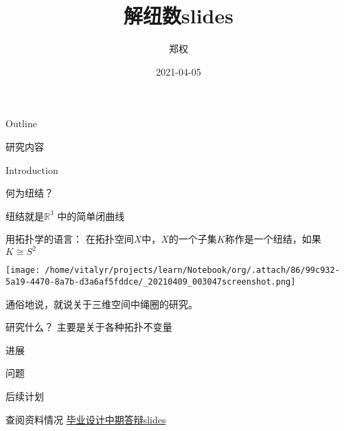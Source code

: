 \documentclass[bigger]{beamer}
\author{郑权}
\date{2021-04-05}
\title{解纽数slides}
\begin{document}
\maketitle
\begin{frame}{Outline}
\tableofcontents
\end{frame}


\begin{frame}[label={sec:org194fc46}]{研究内容}
\begin{block}{Introduction}
\begin{block}{何为纽结？}
\begin{block}{纽结就是\(\mathbb{R}^{3}\) 中的简单闭曲线}
\end{block}
\begin{block}{用拓扑学的语言：}
在拓扑空间\(X\)中，\(X\)的一个子集\(K\)称作是一个纽结，如果\(K \cong S^{2}\)

\begin{center}
\texttt{[image: /home/vitalyr/projects/learn/Notebook/org/.attach/86/99c932-5a19-4470-8a7b-d3a6af5fddce/\_20210409\_003047screenshot.png]}
\end{center}
\end{block}
\end{block}

\begin{block}{}
\end{block}
\begin{block}{通俗地说，就说关于三维空间中绳圈的研究。}
\end{block}
\begin{block}{研究什么？}
主要是关于各种拓扑不变量
\end{block}
\end{block}
\end{frame}
\begin{frame}[label={sec:orgaef2a97}]{进展}
\end{frame}
\begin{frame}[label={sec:org1b6900d}]{问题}
\end{frame}
\begin{frame}[label={sec:orgc8a33ab}]{后续计划}
\end{frame}
\begin{frame}[label={sec:orgf3e16e8}]{查阅资料情况}
\href{20210408031644-毕业设计中期答辩slides.org}{毕业设计中期答辩slides}
\end{frame}
\end{document}
